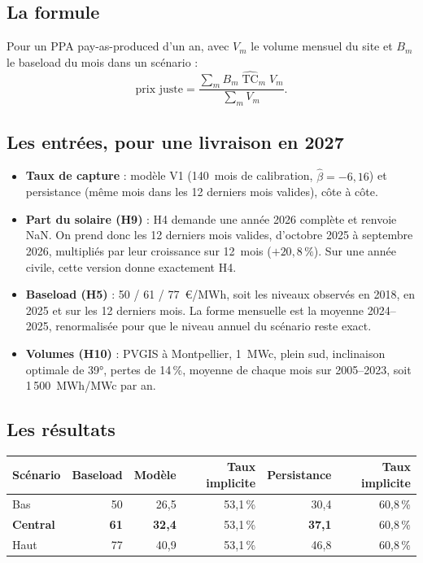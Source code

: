 \documentclass[11pt,a4paper]{article}
\newcommand{\TC}{\mathrm{TC}}
\begin{document}
\subsection{La formule}

Pour un PPA pay-as-produced d'un an, avec $V_m$ le volume mensuel du site et $B_m$ le baseload du mois dans un scénario :
\[
\text{prix juste} = \frac{\sum_m B_m\;\widehat{\TC}_m\;V_m}{\sum_m V_m}.
\]

\subsection{Les entrées, pour une livraison en 2027}

\begin{itemize}
\item \textbf{Taux de capture} : modèle V1 (140~mois de calibration, $\hat\beta = -6{,}16$) et persistance (même mois dans les 12 derniers mois valides), côte à côte.
\item \textbf{Part du solaire (H9)} : H4 demande une année 2026 complète et renvoie NaN. On prend donc les 12 derniers mois valides, d'octobre 2025 à septembre 2026, multipliés par leur croissance sur 12~mois ($+20{,}8\,\%$). Sur une année civile, cette version donne exactement H4.
\item \textbf{Baseload (H5)} : 50 / 61 / 77~€/MWh, soit les niveaux observés en 2018, en 2025 et sur les 12 derniers mois. La forme mensuelle est la moyenne 2024--2025, renormalisée pour que le niveau annuel du scénario reste exact.
\item \textbf{Volumes (H10)} : PVGIS à Montpellier, 1~MWc, plein sud, inclinaison optimale de 39°, pertes de 14\,\%, moyenne de chaque mois sur 2005--2023, soit 1\,500~MWh/MWc par an.
\end{itemize}

\subsection{Les résultats}

\begin{center}
\small
\begin{tabular}{lrrrrr}
\toprule
\textbf{Scénario} & Baseload & Modèle & Taux implicite & Persistance & Taux implicite \\
\midrule
Bas & 50 & 26,5 & 53,1\,\% & 30,4 & 60,8\,\% \\
\textbf{Central} & \textbf{61} & \textbf{32,4} & 53,1\,\% & \textbf{37,1} & 60,8\,\% \\
Haut & 77 & 40,9 & 53,1\,\% & 46,8 & 60,8\,\% \\
\bottomrule
\end{tabular}
\end{center}
\end{document}
